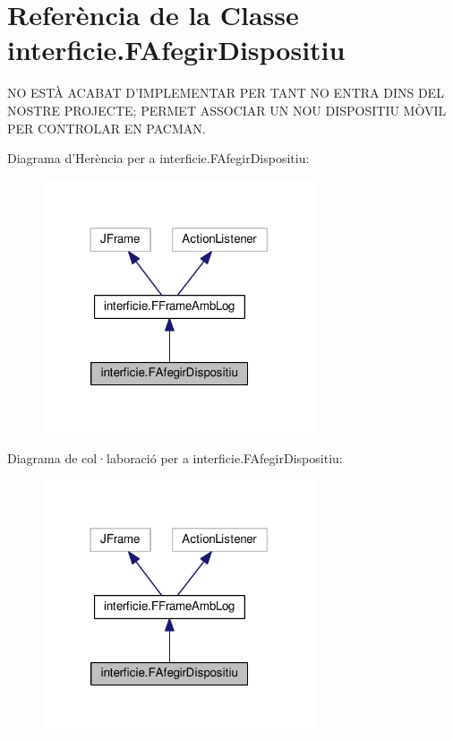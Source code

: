 \hypertarget{classinterficie_1_1_f_afegir_dispositiu}{\section{Referència de la Classe interficie.\+F\+Afegir\+Dispositiu}
\label{classinterficie_1_1_f_afegir_dispositiu}
}


N\+O E\+S\+TÀ A\+C\+A\+B\+A\+T D'I\+M\+P\+L\+E\+M\+E\+N\+T\+A\+R P\+E\+R T\+A\+N\+T N\+O E\+N\+T\+R\+A D\+I\+N\+S D\+E\+L N\+O\+S\+T\+R\+E P\+R\+O\+J\+E\+C\+T\+E; P\+E\+R\+M\+E\+T A\+S\+S\+O\+C\+I\+A\+R U\+N N\+O\+U D\+I\+S\+P\+O\+S\+I\+T\+I\+U MÒ\+V\+I\+L P\+E\+R C\+O\+N\+T\+R\+O\+L\+A\+R E\+N P\+A\+C\+M\+A\+N.  




Diagrama d'Herència per a interficie.\+F\+Afegir\+Dispositiu\+:\nopagebreak
\begin{figure}[H]
\begin{center}
\leavevmode
\includegraphics[width=228pt]{classinterficie_1_1_f_afegir_dispositiu__inherit__graph}
\end{center}
\end{figure}


Diagrama de col·laboració per a interficie.\+F\+Afegir\+Dispositiu\+:\nopagebreak
\begin{figure}[H]
\begin{center}
\leavevmode
\includegraphics[width=228pt]{classinterficie_1_1_f_afegir_dispositiu__coll__graph}
\end{center}
\end{figure}
